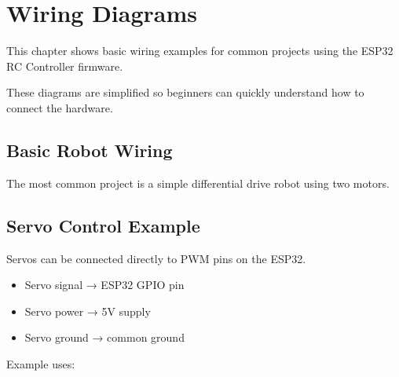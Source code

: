 \chapter{Wiring Diagrams}

This chapter shows basic wiring examples for common projects using the ESP32 RC Controller firmware.

These diagrams are simplified so beginners can quickly understand how to connect the hardware.

\section{Basic Robot Wiring}

The most common project is a simple differential drive robot using two motors.

\begin{center}
\end{center}

\section{Servo Control Example}

Servos can be connected directly to PWM pins on the ESP32.

\begin{itemize}
	\item Servo signal → ESP32 GPIO pin
	\item Servo power → 5V supply
	\item Servo ground → common ground
\end{itemize}

Example uses:

